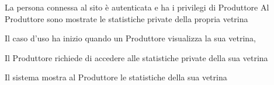 \tabcuvspace

{}
{La persona connessa al sito è autenticata e ha i privilegi di Produttore}
{Al Produttore sono mostrate le statistiche private della propria vetrina}
{\begin{enumCU}
		\item Il caso d'uso ha inizio quando un Produttore visualizza la sua vetrina, 
		\item Il Produttore richiede di accedere alle statistiche private della sua vetrina
		\item Il sistema mostra al Produttore le statistiche della sua vetrina
	\end{enumCU}}


